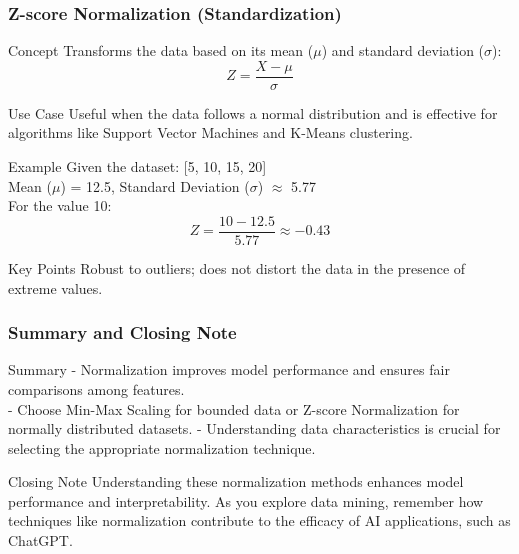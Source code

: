 \documentclass[aspectratio=169]{beamer}
\begin{document}
\begin{frame}[fragile]
    \frametitle{Z-score Normalization (Standardization)}
    \begin{block}{Concept}
        Transforms the data based on its mean ($\mu$) and standard deviation ($\sigma$):
        \begin{equation}
            Z = \frac{X - \mu}{\sigma}
        \end{equation}
    \end{block}
    
    \begin{block}{Use Case}
        Useful when the data follows a normal distribution and is effective for algorithms like Support Vector Machines and K-Means clustering.
    \end{block}
    
    \begin{block}{Example}
        Given the dataset: [5, 10, 15, 20] \\
        Mean ($\mu$) = 12.5, Standard Deviation ($\sigma$) $\approx$ 5.77 \\
        For the value 10:
        \begin{equation}
            Z = \frac{10 - 12.5}{5.77} \approx -0.43
        \end{equation}
    \end{block}
    
    \begin{block}{Key Points}
        Robust to outliers; does not distort the data in the presence of extreme values.
    \end{block}
\end{frame}

\begin{frame}[fragile]
    \frametitle{Summary and Closing Note}
    \begin{block}{Summary}
        - Normalization improves model performance and ensures fair comparisons among features. \\
        - Choose Min-Max Scaling for bounded data or Z-score Normalization for normally distributed datasets.
        - Understanding data characteristics is crucial for selecting the appropriate normalization technique.
    \end{block}

    \begin{block}{Closing Note}
        Understanding these normalization methods enhances model performance and interpretability. As you explore data mining, remember how techniques like normalization contribute to the efficacy of AI applications, such as ChatGPT.
    \end{block}
\end{frame}
\end{document}
